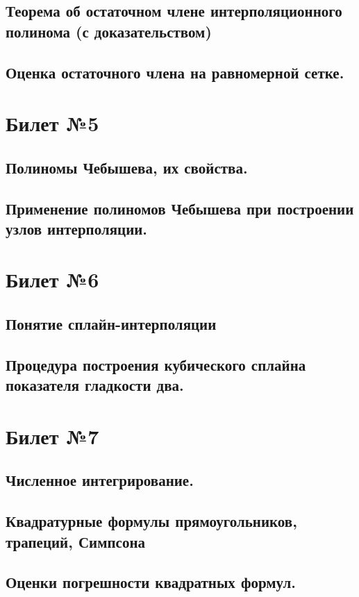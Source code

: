 \documentclass[a4paper]{article}
\begin{document}
\subsection{Теорема об остаточном члене интерполяционного полинома (с доказательством)}
\subsection{Оценка остаточного члена на равномерной сетке.}

\section{Билет №5}
\subsection{Полиномы Чебышева, их свойства. }
\subsection{Применение полиномов Чебышева при построении узлов интерполяции.}

\section{Билет №6}
\subsection{Понятие сплайн-интерполяции}

\subsection{Процедура построения кубического сплайна показателя гладкости два.}

\section{Билет №7}
\subsection{Численное интегрирование.}
\subsection{Квадратурные формулы прямоугольников, трапеций, Симпсона}
\subsection{Оценки погрешности квадратных формул.}
\end{document}
